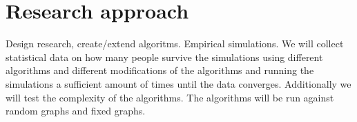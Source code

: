 \chapter{Research approach}
\label{ch:approach}



Design research, create/extend algoritms. Empirical simulations. 
We will collect statistical data on how many people survive the simulations
using different algorithms and different modifications of the algorithms and
running the simulations a sufficient amount of times until the data converges.
Additionally we will test the complexity of the algorithms.
The algorithms will be run against random graphs and fixed graphs. 

